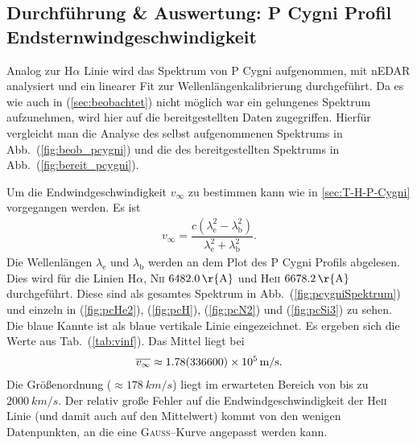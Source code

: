 \subsection{Durchführung \& Auswertung: P Cygni Profil\\Endsternwindgeschwindigkeit}
Analog zur H$\alpha $ Linie wird das Spektrum von P Cygni aufgenommen, mit nEDAR analysiert und ein linearer Fit zur Wellenlängenkalibrierung durchgeführt.
Da es wie auch in (\ref{sec:beobachtet}) nicht möglich war ein gelungenes Spektrum aufzunehmen, wird hier auf die bereitgestellten Daten zugegriffen.
Hierfür vergleicht man die Analyse des selbst aufgenommenen Spektrums in Abb.\ (\ref{fig:beob_pcygni}) und die des bereitgestellten Spektrums in Abb.\ (\ref{fig:bereit_pcygni}).

Um die Endwindgeschwindigkeit $v_\infty$ zu bestimmen kann wie in \ref{sec:T-H-P-Cygni} vorgegangen werden.
Es ist
\begin{align} 
  v_\infty=\dfrac{c\left(\lambda _\text{e}^2-\lambda _\text{b}^2\right)}{\lambda _\text{e}^2+\lambda _\text{b}^2}
.\end{align} 
Die Wellenlängen $\lambda _\text{e}$ und $\lambda _\text{b}$ werden an dem Plot des P Cygni Profils abgelesen.
Dies wird für die Linien H$\alpha$, N\textsc{ii} $\SI{6482,0}{\r{A}}$ und He\textsc{ii} $\SI{6678,2}{\r{A}}$ durchgeführt.  
Diese sind als gesamtes Spektrum in Abb.\ (\ref{fig:pcygniSpektrum}) und einzeln in (\ref{fig:pcHe2}), (\ref{fig:pcH}), (\ref{fig:pcN2}) und (\ref{fig:pcSi3}) zu sehen.
Die blaue Kannte ist als blaue vertikale Linie eingezeichnet.
Es ergeben sich die Werte aus Tab.\ (\ref{tab:vinf}).
Das Mittel liegt bei
\begin{align} 
  \overline{v_\infty}\approx \SI{1.78+-3366e+5}{m/s}
.\end{align} 
Die Größenordnung ($\approx \SI{178}{km/s}$) liegt im erwarteten Bereich von bis zu $\SI{2000}{km/s}$.
Der relativ große Fehler auf die Endwindgeschwindigkeit der He\textsc{ii} Linie (und damit auch auf den Mittelwert) kommt von den wenigen Datenpunkten, an die eine \textsc{Gauss}--Kurve angepasst werden kann. 

